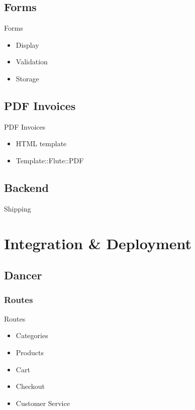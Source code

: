 \subsection{Forms}
\begin{frame}{Forms}
\begin{itemize}
\item Display
\item Validation
\item Storage
\end{itemize}
\end{frame}

\subsection{PDF Invoices}
\begin{frame}{PDF Invoices}
\begin{itemize}
\item HTML template
\item Template::Flute::PDF
\end{itemize}
\end{frame}

\subsection{Backend}
\begin{frame}{Shipping}
\end{frame}

\section{Integration \& Deployment}
\subsection{Dancer}
\subsubsection{Routes}
\begin{frame}{Routes}
\begin{itemize}
\item Categories
\item Products
\item Cart
\item Checkout
\item Customer Service
\end{itemize}
\end{frame}

